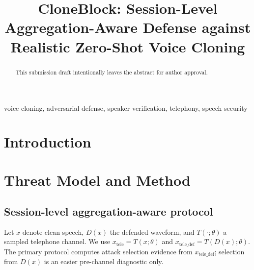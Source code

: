 \documentclass{article}
\title{CloneBlock: Session-Level Aggregation-Aware Defense against\\
Realistic Zero-Shot Voice Cloning}
\begin{document}
\maketitle

\begin{abstract}
This submission draft intentionally leaves the abstract for author approval.
\end{abstract}

\begin{keywords}
voice cloning, adversarial defense, speaker verification, telephony, speech security
\end{keywords}

\section{Introduction}
\label{sec:introduction}

\section{Threat Model and Method}
\label{sec:method}

\subsection{Session-level aggregation-aware protocol}

Let $x$ denote clean speech, $D(x)$ the defended waveform, and
$T(\cdot;\theta)$ a sampled telephone channel. We use
$x_{\mathrm{tele}}=T(x;\theta)$ and
$x_{\mathrm{tele\_def}}=T(D(x);\theta)$. The primary protocol computes attack
selection evidence from $x_{\mathrm{tele\_def}}$; selection from $D(x)$ is an
easier pre-channel diagnostic only.
\end{document}
